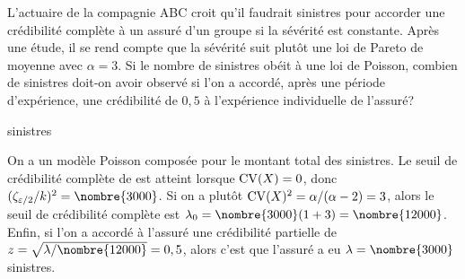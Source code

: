 \begin{exercice}
  L'actuaire de la compagnie ABC croit qu'il faudrait 
  sinistres pour accorder une crédibilité complète à un assuré d'un
  groupe si la sévérité est constante.  Après une étude, il se rend
  compte que la sévérité suit plutôt une loi de Pareto de moyenne
   avec $\alpha = 3$. Si le nombre de sinistres obéit à
  une loi de Poisson, combien de sinistres doit-on avoir observé si
  l'on a accordé, après une période d'expérience, une crédibilité de
  $0,5$ à l'expérience individuelle de l'assuré?
  \begin{rep}
     sinistres
  \end{rep}
  \begin{sol}
    On a un modèle Poisson composée pour le montant total des
    sinistres. Le seuil de crédibilité complète de  est
    atteint lorsque $\operatorname{CV}(X) = 0$, donc
    $(\zeta_{\varepsilon/2}/k)^2 = \nombre{3000}$. Si on a plutôt
    $\operatorname{CV}(X)^2 = \alpha/(\alpha - 2) = 3$, alors le seuil de
    crédibilité complète est $\lambda_0 = \nombre{3000}(1 + 3) =
    \nombre{12000}$. Enfin, si l'on a accordé à l'assuré une
    crédibilité partielle de $z = \sqrt{\lambda/\nombre{12000}} = 0,5$,
    alors c'est que l'assuré a eu $\lambda = \nombre{3000}$
    sinistres.
  \end{sol}
\end{exercice}

